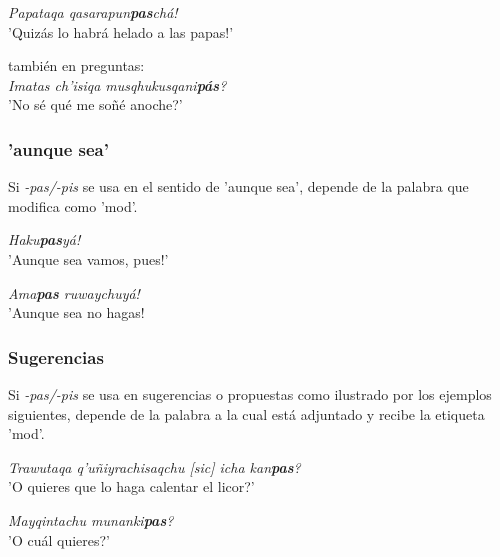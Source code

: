 \documentclass[a4paper,11pt,DIV12]{scrartcl}
\begin{document}
\begin{examples}
 \item {\em Papataqa qasarapun\textbf{pas}ch\'a!}\\
       '{\textexclamdown}Quiz\'as lo habr\'a helado a las papas!'
 \item tambi\'en en preguntas:\\
      {\em Imatas ch'isiqa musqhukusqani\textbf{p\'as}?}\\
      '{\textquestiondown}No s\'e qu\'e me so\~n\'e anoche?'\\
  		\hfill{\small \citep[239]{Cusi2}}
\end{examples}

\subsubsection{'aunque sea'}

Si {\em -pas/-pis} se usa en el sentido de 'aunque sea', depende de la palabra que modifica como 'mod'.

\begin{examples}
 \item {\em Haku\textbf{pas}y\'a!}\\
      '{\textexclamdown}Aunque sea vamos, pues!'
  \item {\em Ama\textbf{pas} ruwaychuy\'a!}\\
      '{\textexclamdown}Aunque sea no hagas!\\
  		\hfill{\small \citep[240]{Cusi2}}
\end{examples}

\subsubsection{Sugerencias}

Si {\em -pas/-pis} se usa en sugerencias o propuestas como ilustrado por los ejemplos siguientes, depende de la palabra a la cual est\'a adjuntado y recibe la etiqueta 'mod'.

\begin{examples}
 \item {\em Trawutaqa q'u\~niyrachisaqchu [sic] icha kan\textbf{pas}?}\\
      '{\textquestiondown}O quieres que lo haga calentar el licor?'
  \item {\em Mayqintachu munanki\textbf{pas}?}\\
	'{\textquestiondown}O cu\'al quieres?'\\
    		\hfill{\small \citep[239]{Cusi2}}
\end{examples}
\end{document}
